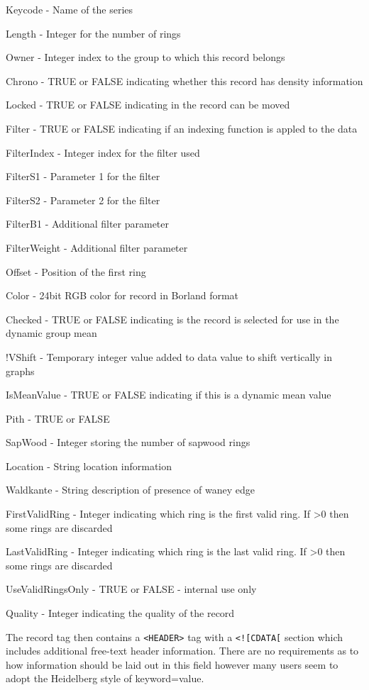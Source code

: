 \begin{itemize*}
    \item  Keycode - Name of the series
    \item  Length - Integer for the number of rings
    \item  Owner - Integer index to the group to which this record belongs
    \item  Chrono - TRUE or FALSE indicating whether this record has density information
    \item  Locked - TRUE or FALSE indicating in the record can be moved
    \item  Filter - TRUE or FALSE indicating if an indexing function is appled to the data
    \item  FilterIndex - Integer index for the filter used
    \item  FilterS1 - Parameter 1 for the filter
    \item  FilterS2 - Parameter 2 for the filter
    \item  FilterB1 - Additional filter parameter
    \item  FilterWeight - Additional filter parameter
    \item  Offset - Position of the first ring
    \item  Color - 24bit RGB color for record in Borland format
    \item  Checked - TRUE or FALSE indicating is the record is selected for use in the dynamic group mean
    \item  !VShift - Temporary integer value added to data value to shift vertically in graphs
    \item  IsMeanValue - TRUE or FALSE indicating if this is a dynamic mean value
    \item  Pith - TRUE or FALSE
    \item  SapWood - Integer storing the number of sapwood rings
    \item  Location - String location information
    \item  Waldkante - String description of presence of waney edge
    \item  FirstValidRing - Integer indicating which ring is the first valid ring. If >0 then some rings are discarded
    \item  LastValidRing - Integer indicating which ring is the last valid ring. If >0 then some rings are discarded
    \item  UseValidRingsOnly - TRUE or FALSE - internal use only
    \item  Quality - Integer indicating the quality of the record 
\end{itemize*}
The record tag then contains a \verb|<HEADER>| tag with a \verb|<![CDATA[| section which includes additional free-text header information. There are no requirements as to how information should be laid out in this field however many users seem to adopt the Heidelberg style of keyword=value.

